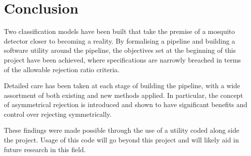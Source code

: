 \section{Conclusion}
\label{sec:conc-conc}
    Two classification models have been built that take the premise of a mosquito detector closer to becoming a reality. By formalising a pipeline and building a software utility around the pipeline, the objectives set at the beginning of this project have been achieved, where specifications are narrowly breached in terms of the allowable rejection ratio criteria. 
    
    Detailed care has been taken at each stage of building the pipeline, with a wide assortment of both existing and new methods applied. In particular, the concept of asymmetrical rejection is introduced and shown to have significant benefits and control over rejecting symmetrically. 

    These findings were made possible through the use of a utility coded along side the project. Usage of this code will go beyond this project and will likely aid in future research in this field. 
